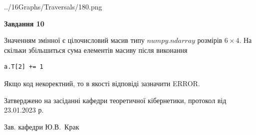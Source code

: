 \documentclass[12pt, ukrainian]{article}
\begin{document}
{\begin {large}
\begin{center}
	{../16Graphs/Traversals/180.png}
\end{center}\par
\newpage

{\begin {center}\textbf{Завдання 10}\end {center}}\par
Значенням змінної  є цілочисловий масив типу $numpy.ndarray$ розмірів $6{\times}4$. На скільки збільшиться сума елементів масиву  після виконання
\begin{verbatim}
a.T[2] += 1
\end{verbatim}


Якщо код некоректний, то в якості відповіді зазначити ERROR.\par
\newpage


\end {large}
}
{\smallskip \begin {small} Затверджено на засіданні кафедри теоретичної кібернетики, протокол  від   23.01.2023 р.\par\smallskip\smallskip
{\parbox {6.5 cm}{Зав. кафедри \dotfill Ю.В.~Крак}} \end{small}}
\end{document}
